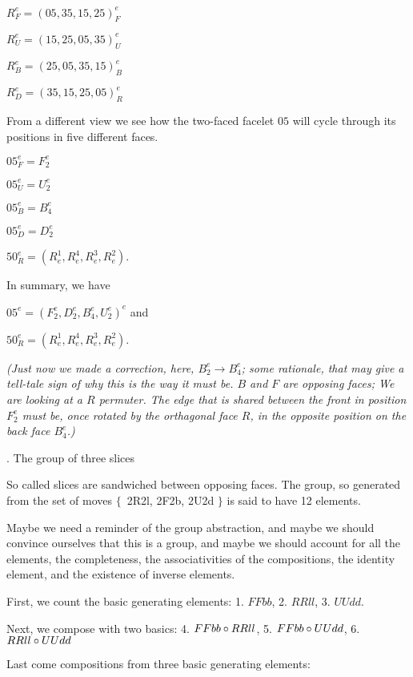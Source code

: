{$R_F^e=(05, 35, 15, 25)_F^e$

$R_U^e=(15, 25, 05, 35)_U^e$

$R_B^e=(25, 05, 35, 15)_B^e$

$R_D^e=(35, 15, 25, 05)_R^e$

\e
From a different view we see how the two-faced facelet $05$
will cycle through its positions in five
different faces.

\smallskip$05_F^e=F_2^e$

$05_U^e=U_2^e$

$05_B^e=B_4^e$

$05_D^e=D_2^e$

$50_R^e=(R_e^1, R_e^4, R_e^3, R_e^2)$.


\e In summary, we have

$05^e=(F_2^e, D_2^e, B_4^e, U_2^e)^e$ and

$50_R^e=(R_e^1, R_e^4, R_e^3, R_e^2)$.

{\it (Just now we made a correction, here, $B_2^e\to B_4^e$; some
rationale, that may give a tell-tale sign of why this is
the way it must be.  $B$ and $F$ are opposing faces; We are
looking at a $R$ permuter.  The edge that is shared between
the front in position $F_2^e$ must be, once rotated by the
orthagonal face $R$, in the opposite position on the back
face $B_4^e$.)}
}%
\hfil\eject
{}. The group of three slices

So called slices are sandwiched between opposing faces.
The group, so generated from the set of moves\break
$\{$~2R2l, 2F2b, 2U2d $\}$
is said to have 12 elements\gg.

Maybe we need a reminder of the group abstraction, and
maybe we should convince ourselves that this is a
group, and maybe we should account for all the elements,
the completeness, the associativities of the compositions,
the identity element, and the existence of inverse elements.

\e First, we count the basic generating elements:
1. $FFbb$, 2. $RRll$, 3. $UUdd$.

Next, we compose with two basics:
4. $FFbb\circ RRll$, 5. $FFbb\circ UUdd$, 6. $RRll\circ UUdd$

Last come compositions from three basic generating elements:

